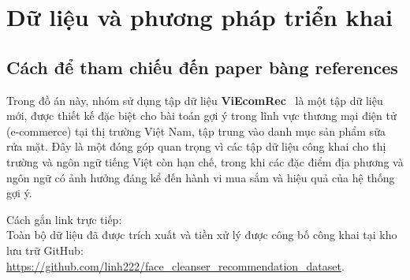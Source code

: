 \chapter{\textbf{Dữ liệu và phương pháp triển khai}}

\section{Cách để tham chiếu đến paper bàng references}

Trong đồ án này, nhóm sử dụng tập dữ liệu \textbf{ViEcomRec}~\cite{tran2023viecomrec} là một tập dữ liệu mới, được thiết kế đặc biệt cho bài toán gợi ý trong lĩnh vực thương mại điện tử (e-commerce) tại thị trường Việt Nam, tập trung vào danh mục sản phẩm sữa rửa mặt. Đây là một đóng góp quan trọng vì các tập dữ liệu công khai cho thị trường và ngôn ngữ tiếng Việt còn hạn chế, trong khi các đặc điểm địa phương và ngôn ngữ có ảnh hưởng đáng kể đến hành vi mua sắm và hiệu quả của hệ thống gợi ý.


Cách gắn link trực tiếp:\\
Toàn bộ dữ liệu đã được trích xuất và tiền xử lý được công bố công khai tại kho lưu trữ GitHub: \url{https://github.com/linh222/face_cleanser_recommendation_dataset}.